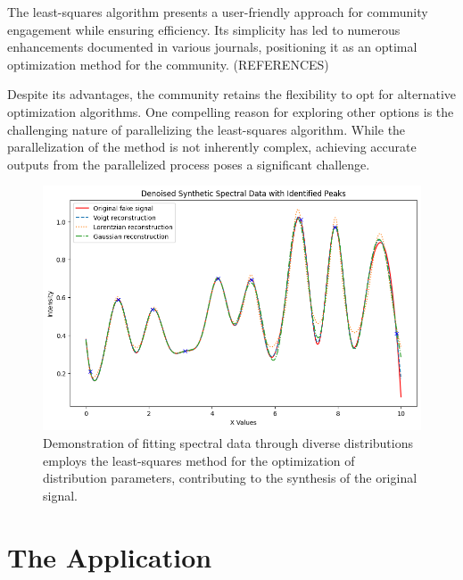 \documentclass{article}
\begin{document}
The least-squares algorithm presents a user-friendly approach for community engagement while ensuring efficiency.
Its simplicity has led to numerous enhancements documented in various journals, positioning it as an optimal optimization method for the community. (REFERENCES)

Despite its advantages, the community retains the flexibility to opt for alternative optimization algorithms.
One compelling reason for exploring other options is the challenging nature of parallelizing the least-squares algorithm.
While the parallelization of the method is not inherently complex, achieving accurate outputs from the parallelized process poses a significant challenge.
\begin{figure}[hbt!]
    \includegraphics[width=\linewidth]{distribution_fitting.png}
    \caption{Demonstration of fitting spectral data through diverse distributions employs the least-squares method for the optimization of distribution parameters, contributing to the synthesis of the original signal.}
    \label{fig:detrending}
\end{figure}


%
%
\section{The Application}
\label{sec:2}
\end{document}
